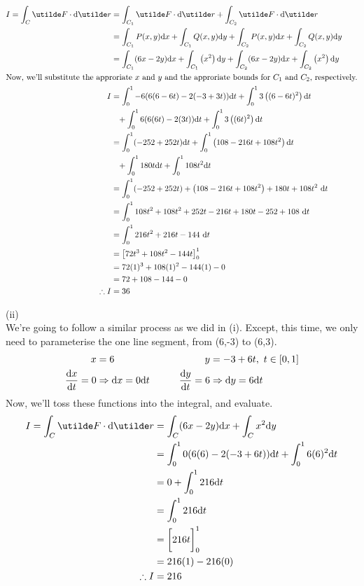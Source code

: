 \documentclass[a4paper,12pt]{report}
\begin{document}
\begin{align*}
  I = \int_C \ut{F}\cd\d\ut{r} &= \int_{C_1}\ut{F}\cd\d\ut{r} + \int_{C_2}\ut{F}\cd\d\ut{r} \\
    &= \int_{C_1}P(x,y)\d x + \int_{C_1}Q(x,y)\d y + \int_{C_2}P(x,y)\d x + \int_{C_2}Q(x,y)\d y \\
    &= \int_{C_1}(6x - 2y)\d x + \int_{C_1}\bracks{x^2}\d y + \int_{C_2}
    (6x - 2y)\d x + \int_{C_2}\bracks{x^2}\d y \\
  \intertext{Now, we'll substitute the approriate $x$ and $y$ and the approriate bounds for $C_1$ and $C_2$, respectively.}
  I &= \int_0^1 -6(6(6-6t) - 2(-3+3t))\d t + \int_0^1 3\bracks{(6-6t)^2}\d t \\ &\phantom{=} + \int_0^1 6(6(6t) - 2(3t))\d t + \int_0^1 3\bracks{(6t)^2}\d t \\
    &= \int_0^1 (-252+252t)\d t + \int_0^1 \bracks{108-216t+108t^{2}}\d t \\ &\phantom{=} + \int_0^1 180t\d t + \int_0^1 108t^2\d t \\
    &= \int_0^1 (-252+252t) + \bracks{108-216t+108t^{2}} + 180t + 108t^2\ \d t \\
    &= \int_0^1 108t^2 + 108t^2 + 252t - 216t + 180t - 252 + 108\ \d t \\
    &= \int_0^1 216t^2 + 216t - 144\ \d t \\
    &= \sqbracks{72t^3 + 108t^2 - 144t}_0^1 \\
    &= 72(1)^3 + 108(1)^2 - 144(1) - 0 \\
    &= 72 + 108 - 144 - 0 \\
  \tf I &= 36
\end{align*}

\sol(ii) \\
We're going to follow a similar process as we did in (i). Except, this time, we only need to parameterise the one line segment, from (6,-3) to (6,3).
\begin{align*}
  x &= 6 &\qquad y &= -3+6t,\ t\in[0,1] \\
  \dyd[x]{t} = 0 &\Rightarrow \d x = 0\d t &\qquad \dyd[y]{t} = 6 &\Rightarrow \d y = 6\d t
\end{align*}
Now, we'll toss these functions into the integral, and evaluate.
\begin{align*}
  I = \int_C \ut{F}\cd\d\ut{r} &= \int_C (6x - 2y)\d x + \int_C x^2\d y \\
    &= \int_0^1 0(6(6) - 2(-3+6t))\d t + \int_0^1 6(6)^2\d t \\
    &= 0 + \int_0^1 216\d t \\
    &= \int_0^1 216\d t \\
    &= \sqbracks{\vphantom{\frac{1}{2}}216t}_0^1 \\
    &= 216(1) - 216(0) \\
  \tf I &= 216
\end{align*}
\end{document}
